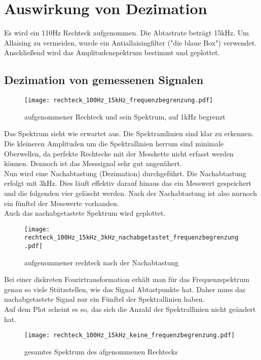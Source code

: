 \documentclass{article}%
\begin{document}
\section{Auswirkung von Dezimation}
	Es wird ein 110Hz Rechteck aufgenommen. Die Abtastrate beträgt 15kHz. Um Allaising zu
 	vermeiden, wurde ein Antiallaisingfilter ("die blaue Box") verwendet. Anschließend wird das
	Amplitudenspektrum bestimmt und geplottet.\\

\subsection{Dezimation von gemessenen Signalen}

	\begin{figure}[htb]
		\centering
		\texttt{[image: rechteck\_100Hz\_15kHz\_frequenzbegrenzung.pdf]}
		\caption{aufgenommener Rechteck und sein Spektrum, auf 1kHz begrenzt}
	\end{figure}

	Das Spektrum sieht wie erwartet aus. Die Spektramlinien sind klar zu erkennen. Die kleineren
 	Amplituden um die Spektrallinien herrum sind minimale Oberwellen, da perfekte Rechtecke mit der
 	Messkette nicht erfasst werden können. Dennoch ist das Messsignal sehr gut angenähert.\\
	Nun wird eine Nachabtastung (Dezimation) durchgeführt. Die Nachabtastung erfolgt mit 3kHz. Dies
 	läuft effektiv darauf hinaus das ein Messwert gespeichert und die folgenden vier gelöscht werden.
 	Nach der Nachabtastung ist also nurnoch ein fünftel der Messwerte vorhanden.\\
	Auch das nachabgetastete Spektrum wird geplottet.

	\begin{figure}[htb]
		\centering
		\texttt{[image: rechteck\_100Hz\_15kHz\_3kHz\_nachabgetastet\_frequenzbegrenzung.pdf]}
		\caption{aufgenommener rechteck nach der Nachabtastung}
	\end{figure}	

	Bei einer diskreten Fourirtransformation erhält man für das Frequenzspektrum genau so viele
 	Stützstellen, wie das Signal Abtastpunkte hat. Daher muss das nachabgetastete Signal nur ein 	
	Fünftel der Spektrallinien haben.\\
	Auf dem Plot scheint es so, das sich die Anzahl der Spektrallinien nicht geändert hat. 

	\begin{figure}[htb]
		\centering
		\texttt{[image: rechteck\_100Hz\_15kHz\_keine\_frequenzbegrenzung.pdf]}
		\caption{gesamtes Spektrum des afgenommenen Rechtecks}
	\end{figure}	
\end{document}
